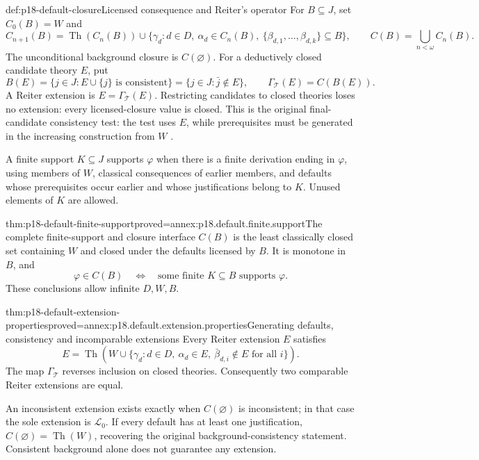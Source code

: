 \begin{hbdefinition}{def:p18-default-closure}{Licensed consequence and Reiter's operator}
For \(B\subseteq J\), set \(C_0(B)=W\) and
\[
 C_{n+1}(B)=\operatorname{Th}(C_n(B))\cup
   \{\gamma_d:d\in D,\ \alpha_d\in C_n(B),\
                              \{\beta_{d,1},\ldots,\beta_{d,k}\}\subseteq B\},
 \qquad C(B)=\bigcup_{n<\omega}C_n(B).
\]
The unconditional background closure is \(C(\varnothing)\).
For a deductively closed candidate theory \(E\), put
\[
 B(E)=\{j\in J:E\cup\{j\}\text{ is consistent}\}
     =\{j\in J:\bar j\notin E\},\qquad
                     \Gamma_{\mathcal T}(E)=C(B(E)).
\]
A Reiter extension is \(E=\Gamma_{\mathcal T}(E)\).
Restricting candidates to closed theories loses
no extension: every licensed-closure value is closed.
This is the original final-candidate consistency test:
the test uses \(E\), while prerequisites must be
generated in the increasing construction from \(W\)
\cite[definition~1, theorem~2.1, pp.~88--90]{Reiter1980}.

A finite support \(K\subseteq J\) supports \(\varphi\)
when there is a finite derivation ending in \(\varphi\),
using members of \(W\), classical consequences of
earlier members, and defaults whose prerequisites
occur earlier and whose justifications belong to \(K\).
Unused elements of \(K\) are allowed.
\end{hbdefinition}

\begin{hblemma}{thm:p18-default-finite-support}{proved=annex:p18.default.finite.support}{The complete finite-support and closure interface}
\(C(B)\) is the least classically closed set containing
\(W\) and closed under the defaults licensed by \(B\).
It is monotone in \(B\), and
\[
 \varphi\in C(B)\quad\Longleftrightarrow\quad
 \text{some finite }K\subseteq B\text{ supports }\varphi.
\]
These conclusions allow infinite \(D,W,B\).
\end{hblemma}

\begin{hbtheorem}{thm:p18-default-extension-properties}{proved=annex:p18.default.extension.properties}{Generating defaults, consistency and incomparable extensions}
Every Reiter extension \(E\) satisfies
\[
 E=\operatorname{Th}\!\left(W\cup
       \{\gamma_d:d\in D,\ \alpha_d\in E,\
                              \bar\beta_{d,i}\notin E\text{ for all }i\}\right).
\]
The map \(\Gamma_{\mathcal T}\) reverses inclusion
on closed theories. Consequently two comparable
Reiter extensions are equal.

An inconsistent extension exists exactly when
\(C(\varnothing)\) is inconsistent; in that
case the sole extension is \(\mathcal L_0\).
If every default has at least one justification,
\(C(\varnothing)=\operatorname{Th}(W)\), recovering
the original background-consistency statement.
Consistent background alone does not guarantee
any extension.
\end{hbtheorem}

